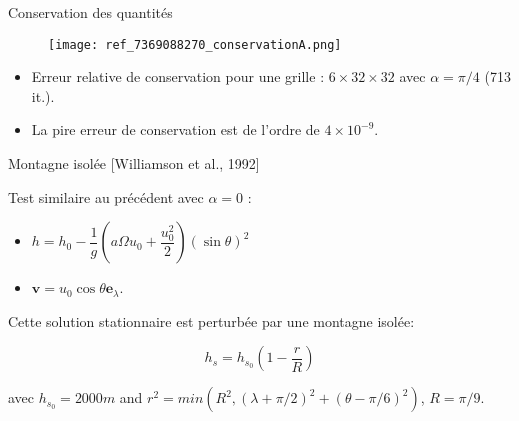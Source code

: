 \documentclass[11pt]{beamer}
\begin{document}
\begin{frame}{Conservation des quantités}
\begin{figure}
\texttt{[image: ref\_7369088270\_conservationA.png]}
\end{figure}
\begin{itemize}
\item Erreur relative de conservation pour une grille : $6 \times 32 \times 32$ avec $\alpha=\pi/4$ (713 it.).
\item La pire erreur de conservation est de l'ordre de $4 \times 10^{-9}$.
\end{itemize}
\end{frame}






























\begin{frame}{Montagne isolée [Williamson et al., 1992]}

\begin{exampleblock}{}
Test similaire au précédent avec $\alpha = 0$ :

\begin{itemize}
\item $h = h_0 - \dfrac{1}{g} \left( a \Omega u_0 + \dfrac{u_0^2}{2} \right)(\sin \theta)^2$
\item $\mathbf{v} = u_0 \cos \theta \mathbf{e}_{\lambda}$.
\end{itemize}

Cette solution stationnaire est perturbée par une montagne isolée:

$$h_s = h_{s_0} \left( 1 - \dfrac{r}{R} \right)$$

avec $h_{s_0}=2000m$ and $r^2=min(R^2, (\lambda + \pi/2)^2+(\theta - \pi/6)^2)$, $R=\pi/9$.
\end{exampleblock}
\end{frame}
\end{document}
